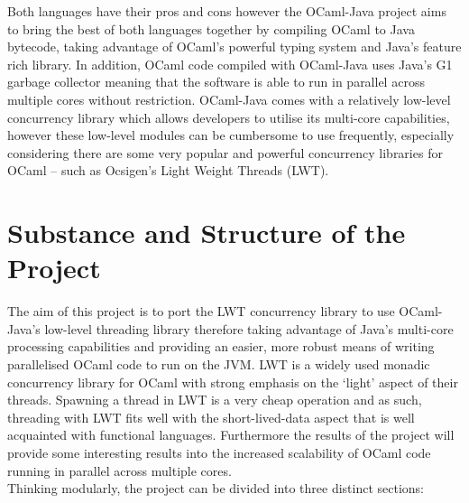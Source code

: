 Both languages have their pros and cons however the OCaml-Java project aims to bring the best of both languages together by compiling OCaml to Java bytecode, taking advantage of OCaml's powerful typing system and Java's feature rich library. In addition, OCaml code compiled with OCaml-Java uses Java's G1 garbage collector meaning that the software is able to run in parallel across multiple cores without restriction. OCaml-Java comes with a relatively low-level concurrency library which allows developers to utilise its multi-core capabilities, however these low-level modules can be cumbersome to use frequently, especially considering there are some very popular and powerful concurrency libraries for OCaml -- such as Ocsigen's Light Weight Threads (LWT).

\section{Substance and Structure of the Project}
\label{sec:substance}
The aim of this project is to port the LWT concurrency library to use OCaml-Java's low-level threading library therefore taking advantage of Java's multi-core processing capabilities and providing an easier, more robust means of writing parallelised OCaml code to run on the JVM. LWT is a widely used monadic concurrency library for OCaml with strong emphasis on the `light' aspect of their threads. Spawning a thread in LWT is a very cheap operation and as such, threading with LWT fits well with the short-lived-data aspect that is well acquainted with functional languages. Furthermore the results of the project will provide some interesting results into the increased scalability of OCaml code running in parallel across multiple cores.\\
Thinking modularly, the project can be divided into three distinct sections:
